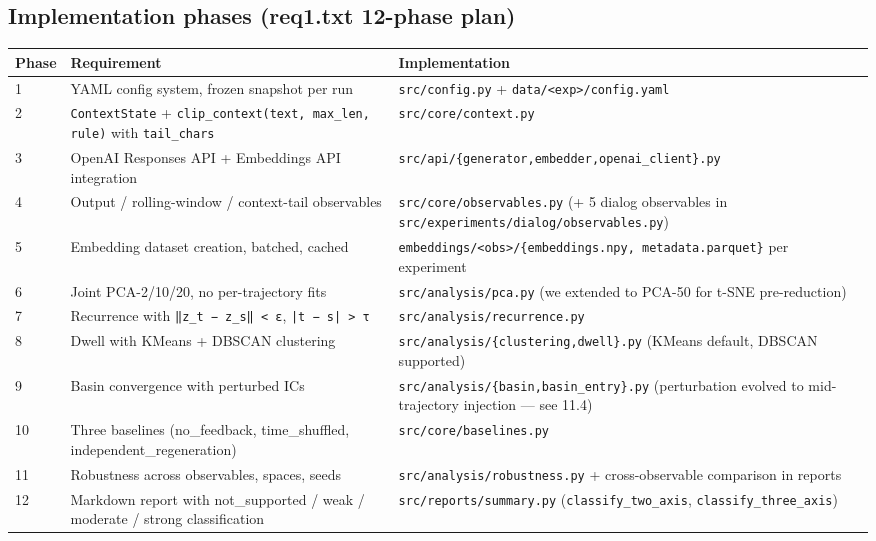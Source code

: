 \documentclass{article}
\theoremstyle{plain}
\theoremstyle{definition}
\begin{document}
\subsection{Implementation phases (req1.txt 12-phase plan)}

\begin{table}[h!]
\centering
\small
\begin{tabular}{lll}
\toprule
Phase & Requirement & Implementation \\
\midrule
1 & YAML config system, frozen snapshot per run & \texttt{src/config.py} + \texttt{data/<exp>/config.yaml} \\
2 & \texttt{ContextState} + \texttt{clip\_context(text, max\_len, rule)} with \texttt{tail\_chars} & \texttt{src/core/context.py} \\
3 & OpenAI Responses API + Embeddings API integration & \texttt{src/api/\{generator,embedder,openai\_client\}.py} \\
4 & Output / rolling-window / context-tail observables & \texttt{src/core/observables.py} (+ 5 dialog observables in \texttt{src/experiments/dialog/observables.py}) \\
5 & Embedding dataset creation, batched, cached & \texttt{embeddings/<obs>/\{embeddings.npy, metadata.parquet\}} per experiment \\
6 & Joint PCA-2/10/20, no per-trajectory fits & \texttt{src/analysis/pca.py} (we extended to PCA-50 for t-SNE pre-reduction) \\
7 & Recurrence with \texttt{‖z\_t − z\_s‖ < ε}, \texttt{|t − s| > τ} & \texttt{src/analysis/recurrence.py} \\
8 & Dwell with KMeans + DBSCAN clustering & \texttt{src/analysis/\{clustering,dwell\}.py} (KMeans default, DBSCAN supported) \\
9 & Basin convergence with perturbed ICs & \texttt{src/analysis/\{basin,basin\_entry\}.py} (perturbation evolved to mid-trajectory injection — see 11.4) \\
10 & Three baselines (no\_feedback, time\_shuffled, independent\_regeneration) & \texttt{src/core/baselines.py} \\
11 & Robustness across observables, spaces, seeds & \texttt{src/analysis/robustness.py} + cross-observable comparison in reports \\
12 & Markdown report with not\_supported / weak / moderate / strong classification & \texttt{src/reports/summary.py} (\texttt{classify\_two\_axis}, \texttt{classify\_three\_axis}) \\
\bottomrule
\end{tabular}
\end{table}
\end{document}
